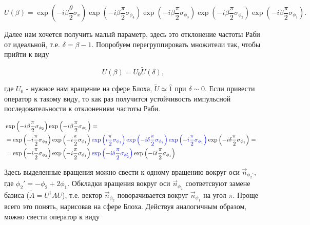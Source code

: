 \begin{equation}
	U(\beta) = \exp\left( - i\beta \frac{\theta}{2} \sigma_x \right)\exp\left( - i \beta \frac{\pi}{2} \sigma_{\phi_4}\right)\exp\left( - i \beta \frac{\pi}{2} \sigma_{\phi_3}\right)\exp\left( - i \beta \frac{\pi}{2} \sigma_{\phi_2}\right)\exp\left( - i \beta \frac{\pi}{2} \sigma_{\phi_1}\right).
\end{equation}

Далее нам хочется получить малый параметр, здесь это отклонение частоты Раби от идеальной, т.е. $\delta = \beta - 1$. Попробуем перегруппировать множители так, чтобы прийти к виду

\begin{equation}
	U(\beta) = U_0 \tilde{U}(\delta),
\end{equation}

где $U_0$ - нужное нам вращение на сфере Блоха, $\tilde{U} \simeq \hat{1}$ при $\delta \sim 0$. Если привести оператор к такому виду, то как раз получится устойчивость импульсной последовательности к отклонениям частоты Раби. 


\begin{equation}
	\begin{aligned}
		& \exp\left( - i \beta \frac{\pi}{2} \sigma_{\phi_2}\right)\exp\left( - i \beta \frac{\pi}{2} \sigma_{\phi_1}\right) =&\\
		&= \exp\left( - i \frac{\pi}{2} \sigma_{\phi_2}\right)\exp\left(- i \frac{\pi}{2} \sigma_{\phi_1}\right)
		\begingroup\color{blue} \exp\left( i \frac{\pi}{2} \sigma_{\phi_1}\right)\exp\left( - i \delta \frac{\pi}{2} \sigma_{\phi_2}\right)\exp\left( - i \frac{\pi}{2} \sigma_{\phi_1}\right) \endgroup
		\exp\left( - i \delta \frac{\pi}{2} \sigma_{\phi_1}\right) =\\
		&= \exp\left( - i \frac{\pi}{2} \sigma_{\phi_2}\right)\exp\left(- i \frac{\pi}{2} \sigma_{\phi_1}\right)
		\begingroup\color{blue}\exp\left( - i \delta \frac{\pi}{2} \sigma_{\phi_2'}\right)\endgroup
		\exp\left( - i \delta \frac{\pi}{2} \sigma_{\phi_1}\right) 
	\end{aligned}
\end{equation}

Здесь выделенные вращения можно свести к одному вращению вокруг оси $\vec{n}_{\phi_2'}$, где $\phi_2' = - \phi_2 + 2\phi_1$. Обкладки вращения вокруг оси $\vec{n}_{\phi_2}$ соответсвуют замене базиса ($\tilde{A} = U^{\dagger}A U$), т.е. вектор $\vec{n}_{\phi_2}$ поворачивается вокруг $\vec{n}_{\phi_1}$ на угол $\pi$. Проще всего это понять, нарисовав на сфере Блоха. Действуя аналогичным образом, можно свести оператор к виду

